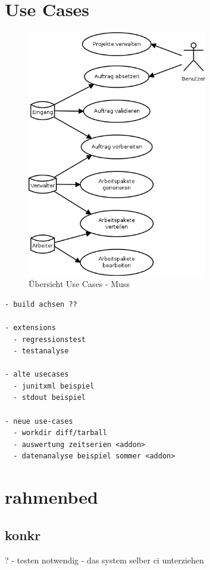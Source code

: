 \section{Use Cases}



\begin{figure}[ht]
  \label{fig:use-case-muss}
  \begin{center}
      \includegraphics[width=0.7\textwidth]{imageinput/use-case-muss.png}
  \end{center}
  \caption{\"Ubersicht Use Cases - Muss}
\end{figure}


\begin{verbatim}
- build achsen ??

- extensions
  - regressionstest
  - testanalyse

- alte usecases
  - junitxml beispiel
  - stdout beispiel

- neue use-cases
  - workdir diff/tarball
  - auswertung zeitserien <addon>
  - datenanalyse beispiel sommer <addon>
\end{verbatim}


\section{rahmenbed}

\subsection{konkr}?
- testen notwendig
- das system selber ci unterziehen

